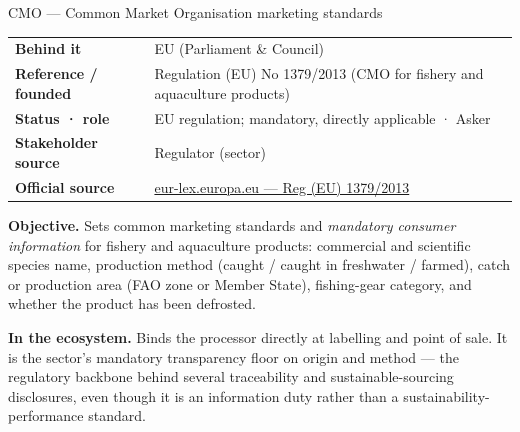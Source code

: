 
CMO --- Common Market Organisation marketing standards

{\def\LTcaptype{none}
\begin{longtable}[]{@{}
  >{\raggedright\arraybackslash}p{}
  >{\raggedright\arraybackslash}p{}@{}}
\toprule\noalign{}
\endhead
\bottomrule\noalign{}
\endlastfoot
\textbf{Behind it} & EU (Parliament \& Council) \\
\textbf{Reference / founded} & Regulation (EU) No 1379/2013 (CMO for fishery and aquaculture products) \\
\textbf{Status · role} & EU regulation; mandatory, directly applicable · Asker \\
\textbf{Stakeholder source} & Regulator (sector) \\
\textbf{Official source} & \href{https://eur-lex.europa.eu/eli/reg/2013/1379/oj}{eur-lex.europa.eu --- Reg (EU) 1379/2013} \\
\end{longtable}
}

\textbf{Objective.} Sets common marketing standards and \emph{mandatory consumer information} for fishery and aquaculture products: commercial and scientific species name, production method (caught / caught in freshwater / farmed), catch or production area (FAO zone or Member State), fishing-gear category, and whether the product has been defrosted.

\textbf{In the ecosystem.} Binds the processor directly at labelling and point of sale. It is the sector's mandatory transparency floor on origin and method --- the regulatory backbone behind several traceability and sustainable-sourcing disclosures, even though it is an information duty rather than a sustainability-performance standard.

